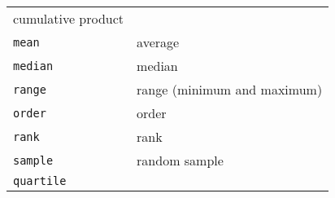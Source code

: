 \documentclass[11pt]{article}
\begin{document}
\begin{longtable}[c]{@{}ll@{}}
\begin{minipage}[t]{0.81\columnwidth}\raggedright\strut
cumulative product
\strut\end{minipage}\tabularnewline
\begin{minipage}[t]{0.13\columnwidth}\raggedright\strut
\texttt{mean}
\strut\end{minipage} &
\begin{minipage}[t]{0.81\columnwidth}\raggedright\strut
average
\strut\end{minipage}\tabularnewline
\begin{minipage}[t]{0.13\columnwidth}\raggedright\strut
\texttt{median}
\strut\end{minipage} &
\begin{minipage}[t]{0.81\columnwidth}\raggedright\strut
median
\strut\end{minipage}\tabularnewline
\begin{minipage}[t]{0.13\columnwidth}\raggedright\strut
\texttt{range}
\strut\end{minipage} &
\begin{minipage}[t]{0.81\columnwidth}\raggedright\strut
range (minimum and maximum)
\strut\end{minipage}\tabularnewline
\begin{minipage}[t]{0.13\columnwidth}\raggedright\strut
\texttt{order}
\strut\end{minipage} &
\begin{minipage}[t]{0.81\columnwidth}\raggedright\strut
order
\strut\end{minipage}\tabularnewline
\begin{minipage}[t]{0.13\columnwidth}\raggedright\strut
\texttt{rank}
\strut\end{minipage} &
\begin{minipage}[t]{0.81\columnwidth}\raggedright\strut
rank
\strut\end{minipage}\tabularnewline
\begin{minipage}[t]{0.13\columnwidth}\raggedright\strut
\texttt{sample}
\strut\end{minipage} &
\begin{minipage}[t]{0.81\columnwidth}\raggedright\strut
random sample
\strut\end{minipage}\tabularnewline
\begin{minipage}[t]{0.13\columnwidth}\raggedright\strut
\texttt{quartile}
\strut\end{minipage} &
\begin{minipage}[t]{0.81\columnwidth}\raggedright\strut

\end{minipage}
\end{longtable}
\end{document}
